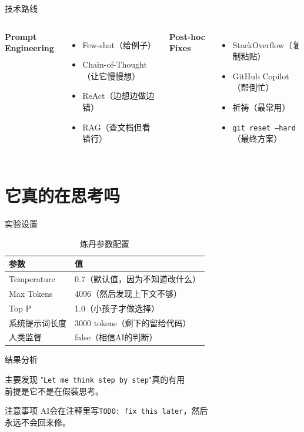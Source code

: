 \documentclass[aspectratio=169, 11pt]{beamer}
\begin{document}
\begin{frame}{技术路线}
  \begin{columns}
      \textbf{Prompt Engineering}
      \begin{itemize}
        \item Few-shot（给例子）
        \item Chain-of-Thought（让它慢慢想）
        \item ReAct（边想边做边错）
        \item RAG（查文档但看错行）
      \end{itemize}
      \textbf{Post-hoc Fixes}
      \begin{itemize}
        \item StackOverflow（复制粘贴）
        \item GitHub Copilot（帮倒忙）
        \item 祈祷（最常用）
        \item \texttt{git reset --hard}（最终方案）
      \end{itemize}
  \end{columns}
\end{frame}

\section{它真的在思考吗}

\begin{frame}{实验设置}
  \begin{table}[htbp]
    \centering
    \caption{炼丹参数配置}
    \begin{tabular}{ll}
      \toprule
      参数 & 值 \\
      \midrule
      Temperature & 0.7（默认值，因为不知道改什么） \\
      Max Tokens & 4096（然后发现上下文不够） \\
      Top P & 1.0（小孩子才做选择） \\
      系统提示词长度 & 3000 tokens（剩下的留给代码） \\
      人类监督 & false（相信AI的判断） \\
      \bottomrule
    \end{tabular}
  \end{table}
\end{frame}

\begin{frame}{结果分析}
  \begin{exampleblock}{主要发现}
    "\texttt{Let me think step by step}"真的有用\\
    前提是它不是在\alert{假装}思考。
  \end{exampleblock}
  \begin{alertblock}{注意事项}
    AI会在注释里写\texttt{TODO: fix this later}，然后\\
    \alert{永远不会}回来修。
  \end{alertblock}
\end{frame}
\end{document}
